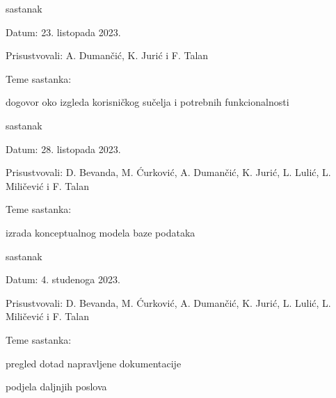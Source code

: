 \begin{packed_enum}
            \item  sastanak
			\item[] \begin{packed_item}
				\item Datum: 23. listopada 2023.
				\item Prisustvovali: A. Dumančić, K. Jurić i F. Talan
				\item Teme sastanka:
				\begin{packed_item}
					\item  dogovor oko izgleda korisničkog sučelja i potrebnih funkcionalnosti
				\end{packed_item}
			\end{packed_item}

            \item  sastanak
			\item[] \begin{packed_item}
				\item Datum: 28. listopada 2023.
				\item Prisustvovali: D. Bevanda, M. Ćurković, A. Dumančić, K. Jurić, L. Lulić, L. Miličević i F. Talan
				\item Teme sastanka:
				\begin{packed_item}
					\item  izrada konceptualnog modela baze podataka
				\end{packed_item}
			\end{packed_item}

			\item  sastanak
			\item[] \begin{packed_item}
				\item Datum: 4. studenoga 2023.
				\item Prisustvovali: D. Bevanda, M. Ćurković, A. Dumančić, K. Jurić, L. Lulić, L. Miličević i F. Talan
				\item Teme sastanka:
				\begin{packed_item}
					\item  pregled dotad napravljene dokumentacije
                    			\item  podjela daljnjih poslova
				\end{packed_item}
			\end{packed_item}


\end{packed_enum}
